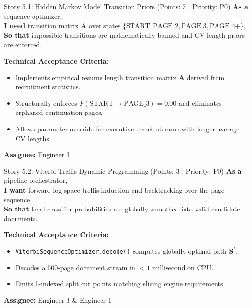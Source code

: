 \documentclass[11pt,a4paper]{article}
\begin{document}
\begin{storybox}{Story 5.1: Hidden Markov Model Transition Priors (Points: 3 $|$ Priority: P0)}
\textbf{As a} sequence optimizer, \\
\textbf{I need} transition matrix $\mathbf{A}$ over states $\{\text{START}, \text{PAGE\_2}, \text{PAGE\_3}, \text{PAGE\_4+}\}$, \\
\textbf{So that} impossible transitions are mathematically banned and CV length priors are enforced.

\vspace{0.3em}
\textbf{Technical Acceptance Criteria:}
\begin{itemize}[leftmargin=1.2em, itemsep=1pt]
    \item Implements empirical resume length transition matrix $\mathbf{A}$ derived from recruitment statistics.
    \item Structurally enforces $P(\text{START} \to \text{PAGE\_3}) = 0.00$ and eliminates orphaned continuation pages.
    \item Allows parameter override for executive search streams with longer average CV lengths.
\end{itemize}
\textbf{Assignee:} Engineer 3
\end{storybox}

\begin{storybox}{Story 5.2: Viterbi Trellis Dynamic Programming (Points: 3 $|$ Priority: P0)}
\textbf{As a} pipeline orchestrator, \\
\textbf{I want} forward log-space trellis induction and backtracking over the page sequence, \\
\textbf{So that} local classifier probabilities are globally smoothed into valid candidate documents.

\vspace{0.3em}
\textbf{Technical Acceptance Criteria:}
\begin{itemize}[leftmargin=1.2em, itemsep=1pt]
    \item \texttt{ViterbiSequenceOptimizer.decode()} computes globally optimal path $\mathbf{S}^\ast$.
    \item Decodes a 500-page document stream in $<1\text{ millisecond}$ on CPU.
    \item Emits 1-indexed split cut points matching slicing engine requirements.
\end{itemize}
\textbf{Assignee:} Engineer 3 \& Engineer 1
\end{storybox}

\clearpage
\end{document}

